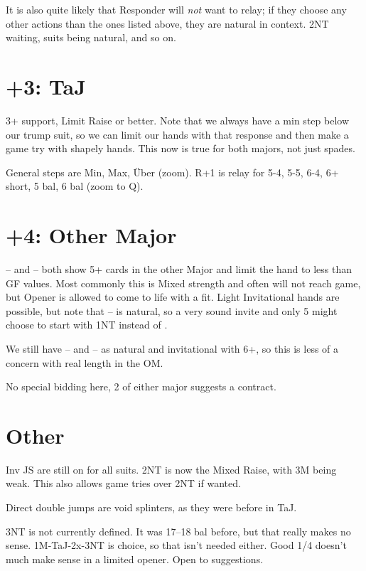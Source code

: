 \documentclass[tom-ari]{subfile}
\begin{document}
	It is also quite likely that Responder will \textit{not} want to relay; if they choose any other actions than the ones listed above, they are natural in context.  2NT waiting, suits being natural, and so on.
	
	\section{+3: TaJ}
	
	3+ support, Limit Raise or better.  Note that we always have a min step below our trump suit, so we can limit our hands with that response and then make a game try with shapely hands.  This now is true for both majors, not just spades.
	
	General steps are Min, Max, \"Uber (zoom). R+1 is relay for 5-4, 5-5, 6-4, 6+ short, 5 bal, 6 bal (zoom to Q).
	
	\section{+4: Other Major}
	
	-- and -- both show 5+ cards in the other Major and limit the hand to less than GF values.  Most commonly this is Mixed strength and often will not reach game, but Opener is allowed to come to life with a fit.  Light Invitational hands are possible, but note that -- is natural, so a very sound invite and only 5  might choose to start with 1NT instead of .

	We still have -- and -- as natural and invitational with 6+, so this is less of a concern with real length in the OM.  
	
	No special bidding here, 2 of either major suggests a contract.  	
	
	\section{Other}
	
	Inv JS are still on for all suits.  2NT is now the Mixed Raise, with 3M being weak.  This also allows game tries over 2NT if wanted.
	
	Direct double jumps are void splinters, as they were before in TaJ.  
	
	3NT is not currently defined.  It was 17--18 bal before, but that really makes no sense. 1M-TaJ-2x-3NT is choice, so that isn't needed either.  Good 1/4 doesn't much make sense in a limited opener.  Open to suggestions.
	
\end{document}

